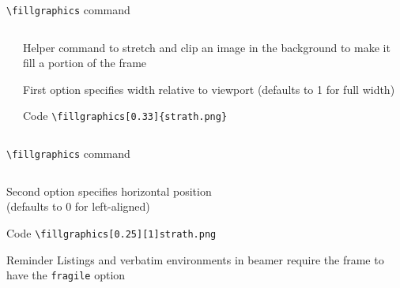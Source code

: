 \documentclass[aspectratio=169]{beamer}
\begin{document}
\begin{frame}[fragile]{\texttt{\textbackslash{}fillgraphics} command}
	\begin{columns}
		\begin{column}{0.33\textwidth}
		\end{column}
		\begin{column}{0.65\textwidth}
			\begin{block}{}
				Helper command to stretch and clip an image in the background to make it fill a portion of the frame
			\end{block}
			\begin{block}{}
				First option specifies width relative to viewport (defaults to 1 for full width)
			\end{block}
			\begin{exampleblock}{Code}\small
				\verb|\fillgraphics[0.33]{strath.png}|
			\end{exampleblock}
		\end{column}
	\end{columns}
\end{frame}

\begin{frame}[fragile]{\texttt{\textbackslash{}fillgraphics} command}
	\fillgraphics[0.25][1]{strath.png}
	\begin{columns}
		\begin{column}{0.72\textwidth}
			\begin{block}{}
				Second option specifies horizontal position\\
				(defaults to 0 for left-aligned)
			\end{block}
			\begin{exampleblock}{Code}
				\texttt{\textbackslash{}fillgraphics[0.25][1]{strath.png}}
			\end{exampleblock}
			\begin{alertblock}{Reminder}
				Listings and verbatim environments in beamer require the frame to have the \verb|fragile| option
			\end{alertblock}
		\end{column}
		\begin{column}{0.25\textwidth}
		\end{column}
	\end{columns}
\end{frame}
\end{document}
